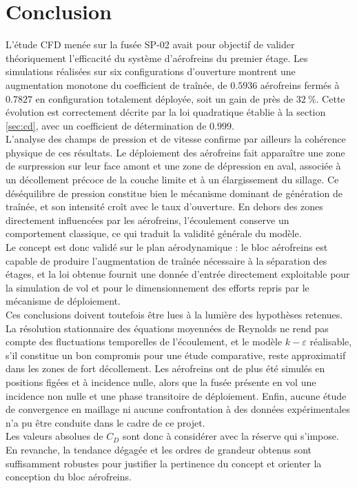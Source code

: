 \section*{Conclusion}

L'étude \acrshort{CFD} menée sur la fusée SP-02 avait pour objectif de valider théoriquement l'efficacité du système d'aérofreins
du premier étage. Les simulations réalisées sur six configurations d'ouverture montrent une augmentation monotone du coefficient
de traînée, de $0.5936$ aérofreins fermés à $0.7827$ en configuration totalement déployée, soit un gain de près de $32~\%$. Cette
évolution est correctement décrite par la loi quadratique établie à la section \ref{sec:cd}, avec un coefficient de détermination
de $0.999$.\\

L'analyse des champs de pression et de vitesse confirme par ailleurs la cohérence physique de ces résultats. Le déploiement des
aérofreins fait apparaître une zone de surpression sur leur face amont et une zone de dépression en aval, associée à un
décollement précoce de la couche limite et à un élargissement du sillage. Ce déséquilibre de pression constitue bien le mécanisme
dominant de génération de traînée, et son intensité croît avec le taux d'ouverture. En dehors des zones directement influencées
par les aérofreins, l'écoulement conserve un comportement classique, ce qui traduit la validité générale du modèle.\\

Le concept est donc validé sur le plan aérodynamique : le bloc aérofreins est capable de produire l'augmentation de traînée
nécessaire à la séparation des étages, et la loi obtenue fournit une donnée d'entrée directement exploitable pour la simulation
de vol et pour le dimensionnement des efforts repris par le mécanisme de déploiement.\\

Ces conclusions doivent toutefois être lues à la lumière des hypothèses retenues. La résolution stationnaire des équations
moyennées de Reynolds ne rend pas compte des fluctuations temporelles de l'écoulement, et le modèle $k-\varepsilon$ réalisable,
s'il constitue un bon compromis pour une étude comparative, reste approximatif dans les zones de fort décollement. Les aérofreins
ont de plus été simulés en positions figées et à incidence nulle, alors que la fusée présente en vol une incidence non nulle et
une phase transitoire de déploiement. Enfin, aucune étude de convergence en maillage ni aucune confrontation à des données
expérimentales n'a pu être conduite dans le cadre de ce projet.\\

Les valeurs absolues de $C_D$ sont donc à considérer avec la réserve qui s'impose. En revanche, la tendance dégagée et les ordres
de grandeur obtenus sont suffisamment robustes pour justifier la pertinence du concept et orienter la conception du bloc
aérofreins.
